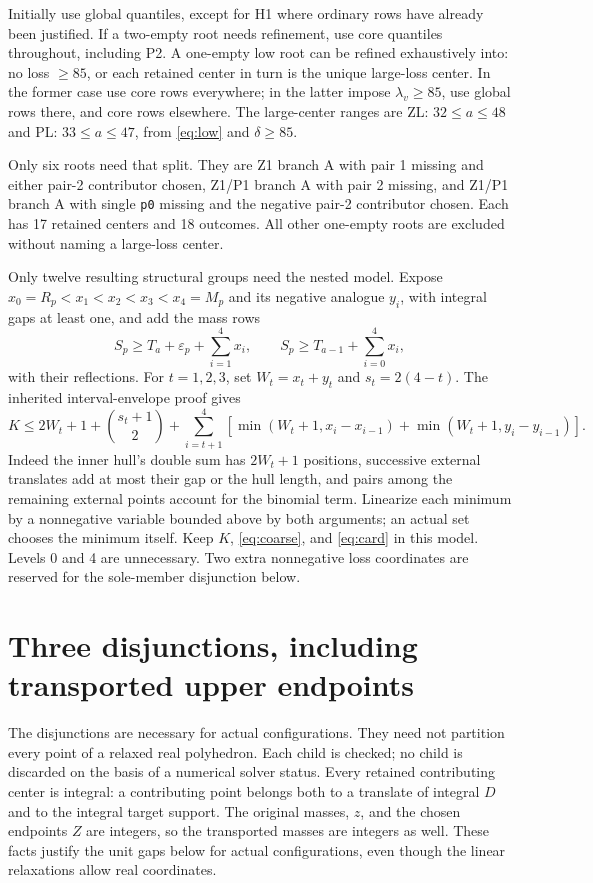 \documentclass[11pt,a4paper]{article}
\begin{document}
Initially use global quantiles, except for H1 where ordinary rows have
already been justified. If a two-empty root needs refinement, use core
quantiles throughout, including P2. A one-empty low root can be refined
exhaustively into: no loss $\ge85$, or each retained center in turn is
the unique large-loss center. In the former case use core rows everywhere;
in the latter impose $\lambda_v\ge85$, use global rows there, and core
rows elsewhere. The large-center ranges are ZL: $32\le a\le48$ and
PL: $33\le a\le47$, from \eqref{eq:low} and $\delta\ge85$.

Only six roots need that split. They are Z1 branch A with pair 1 missing
and either pair-2 contributor chosen, Z1/P1 branch A with pair 2 missing,
and Z1/P1 branch A with single \texttt{p0} missing and the negative
pair-2 contributor chosen. Each has 17 retained centers and 18 outcomes.
All other one-empty roots are excluded without naming a large-loss center.

Only twelve resulting structural groups need the nested model.
Expose $x_0=R_p<x_1<x_2<x_3<x_4=M_p$ and its negative analogue $y_i$,
with integral gaps at least one, and add the mass rows
\[
 S_p\ge T_a+\varepsilon_p+\sum_{i=1}^4x_i,\qquad
 S_p\ge T_{a-1}+\sum_{i=0}^4x_i,
\]
with their reflections. For $t=1,2,3$, set $W_t=x_t+y_t$ and $s_t=2(4-t)$.
The inherited interval-envelope proof gives
\[
 K\le2W_t+1+\binom{s_t+1}{2}
 +\sum_{i=t+1}^4\left[
 \min(W_t+1,x_i-x_{i-1})+\min(W_t+1,y_i-y_{i-1})\right].
\]
Indeed the inner hull's double sum has $2W_t+1$ positions, successive
external translates add at most their gap or the hull length, and pairs
among the remaining external points account for the binomial term.
Linearize each minimum by a nonnegative variable bounded above by both
arguments; an actual set chooses the minimum itself. Keep $K$,
\eqref{eq:coarse}, and \eqref{eq:card} in this model. Levels 0 and 4 are
unnecessary. Two extra nonnegative loss coordinates are reserved for
the sole-member disjunction below.

\section{Three disjunctions, including transported upper endpoints}
The disjunctions are necessary for actual configurations. They need not
partition every point of a relaxed real polyhedron. Each child is checked;
no child is discarded on the basis of a numerical solver status.
Every retained contributing center is integral: a contributing point
belongs both to a translate of integral $D$ and to the integral target
support. The original masses, $z$, and the chosen endpoints $Z$ are
integers, so the transported masses are integers as well. These facts
justify the unit gaps below for actual configurations, even though the
linear relaxations allow real coordinates.
\end{document}
